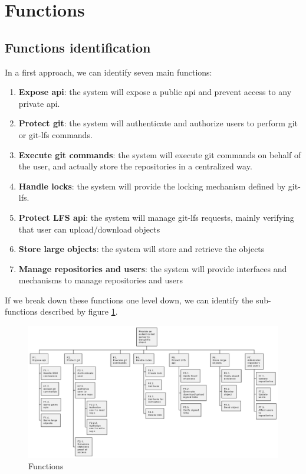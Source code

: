 \newpage
\section{Functions}

\subsection{Functions identification}

In a first approach, we can identify seven main functions:

\begin{enumerate}
    \item \textbf{Expose api}: the system will expose a public api and prevent access to any private api.
    \item \textbf{Protect git}: the system will authenticate and authorize users to perform git or git-lfs commands.
    \item \textbf{Execute git commands}: the system will execute git commands on behalf of the user, and actually store the repositories in a centralized way.
    \item \textbf{Handle locks}: the system will provide the locking mechanism defined by git-lfs.
    \item \textbf{Protect LFS api}: the system will manage git-lfs requests, mainly verifying that user can upload/download objects
    \item \textbf{Store large objects}: the system will store and retrieve the objects
    \item \textbf{Manage repositories and users}: the system will provide interfaces and mechanisms to manage repositories and users
\end{enumerate}

If we break down these functions one level down, we can identify the sub-functions described by figure \ref{fig:functions}.

\begin{figure}[h]
    \centering
    \includegraphics[width=\textwidth]{iteration_01/diagrams/functions.png}
    \caption{Functions}
    \label{fig:functions}
\end{figure}

